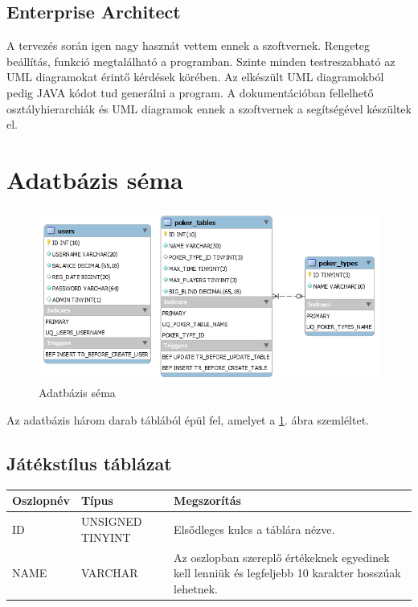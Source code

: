 \subsection{Enterprise Architect}
A tervezés során igen nagy hasznát vettem ennek a szoftvernek. Rengeteg beállítás, funkció megtalálható a programban. Szinte minden testreszabható az UML diagramokat érintő kérdések körében. Az elkészült UML diagramokból pedig JAVA kódot tud generálni a program. A dokumentációban fellelhető osztályhierarchiák és UML diagramok ennek a szoftvernek a segítségével készültek el.

\section{Adatbázis séma} \label{sec:db-schema}
\begin{figure}[h!]
  \caption{Adatbázis séma}
  \label{fig:db_scheme}
  \centering
    \includegraphics[width=\textwidth]{user-documentation/images/db_scheme2.png}
\end{figure}
Az adatbázis három darab táblából épül fel, amelyet a \ref{fig:db_scheme}. ábra szemléltet.

\subsection{Játékstílus táblázat}
\begin{tabular}{| C{3.8cm} | C{4.2cm} | C{6.1cm} |}
\hline
 \textbf{Oszlopnév} & \textbf{Típus} & \textbf{Megszorítás} \\ \hline
  ID & UNSIGNED TINYINT & Elsődleges kulcs a táblára nézve. \\ \hline
  NAME & VARCHAR & Az oszlopban szereplő értékeknek egyedinek kell lenniük és legfeljebb 10 karakter hosszúak lehetnek.  \\ \hline
\end{tabular}

